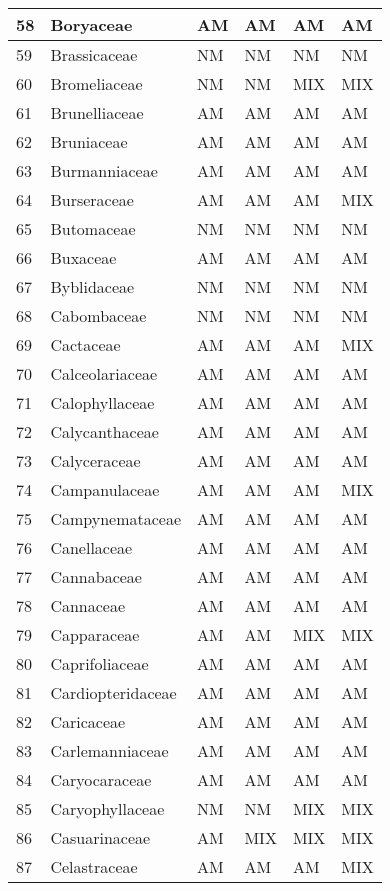 \documentclass[]{article}
\begin{document}
\begin{longtable}{l|l|l|l|l|l}
\hline
58 & Boryaceae & AM & AM & AM & AM\\
\hline
59 & Brassicaceae & NM & NM & NM & NM\\
\hline
60 & Bromeliaceae & NM & NM & MIX & MIX\\
\hline
61 & Brunelliaceae & AM & AM & AM & AM\\
\hline
62 & Bruniaceae & AM & AM & AM & AM\\
\hline
63 & Burmanniaceae & AM & AM & AM & AM\\
\hline
64 & Burseraceae & AM & AM & AM & MIX\\
\hline
65 & Butomaceae & NM & NM & NM & NM\\
\hline
66 & Buxaceae & AM & AM & AM & AM\\
\hline
67 & Byblidaceae & NM & NM & NM & NM\\
\hline
68 & Cabombaceae & NM & NM & NM & NM\\
\hline
69 & Cactaceae & AM & AM & AM & MIX\\
\hline
70 & Calceolariaceae & AM & AM & AM & AM\\
\hline
71 & Calophyllaceae & AM & AM & AM & AM\\
\hline
72 & Calycanthaceae & AM & AM & AM & AM\\
\hline
73 & Calyceraceae & AM & AM & AM & AM\\
\hline
74 & Campanulaceae & AM & AM & AM & MIX\\
\hline
75 & Campynemataceae & AM & AM & AM & AM\\
\hline
76 & Canellaceae & AM & AM & AM & AM\\
\hline
77 & Cannabaceae & AM & AM & AM & AM\\
\hline
78 & Cannaceae & AM & AM & AM & AM\\
\hline
79 & Capparaceae & AM & AM & MIX & MIX\\
\hline
80 & Caprifoliaceae & AM & AM & AM & AM\\
\hline
81 & Cardiopteridaceae & AM & AM & AM & AM\\
\hline
82 & Caricaceae & AM & AM & AM & AM\\
\hline
83 & Carlemanniaceae & AM & AM & AM & AM\\
\hline
84 & Caryocaraceae & AM & AM & AM & AM\\
\hline
85 & Caryophyllaceae & NM & NM & MIX & MIX\\
\hline
86 & Casuarinaceae & AM & MIX & MIX & MIX\\
\hline
87 & Celastraceae & AM & AM & AM & MIX\\

\end{longtable}
\end{document}
